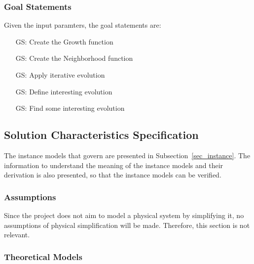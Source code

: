 \documentclass[12pt]{article}
\newcounter{goalnum} %
\begin{document}
\subsubsection{Goal Statements}

\noindent Given the input paramters, the goal statements are:

\begin{itemize}

\item[GS\refstepcounter{goalnum}\thegoalnum \label{G_GFCT}:] Create the Growth function

\item[GS\refstepcounter{goalnum}\thegoalnum \label{G_meaningfulLabel}:] Create the Neighborhood function

\item[GS\refstepcounter{goalnum}\thegoalnum \label{G_meaningfulLabel}:] Apply iterative evolution

\item[GS\refstepcounter{goalnum}\thegoalnum \label{G_meaningfulLabel}:] Define interesting evolution

\item[GS\refstepcounter{goalnum}\thegoalnum \label{G_meaningfulLabel}:] Find some interesting evolution

\end{itemize}

\subsection{Solution Characteristics Specification}

The instance models that govern \progname{} are presented in
Subsection~\ref{sec_instance}.  The information to understand the meaning of the
instance models and their derivation is also presented, so that the instance
models can be verified.


\subsubsection{Assumptions} \label{sec_assumpt}

Since the project does not aim to model a physical system by simplifying it, 
no assumptions of physical simplification will be made. Therefore, this section is not relevant.

\subsubsection{Theoretical Models}\label{sec_theoretical}
\end{document}
